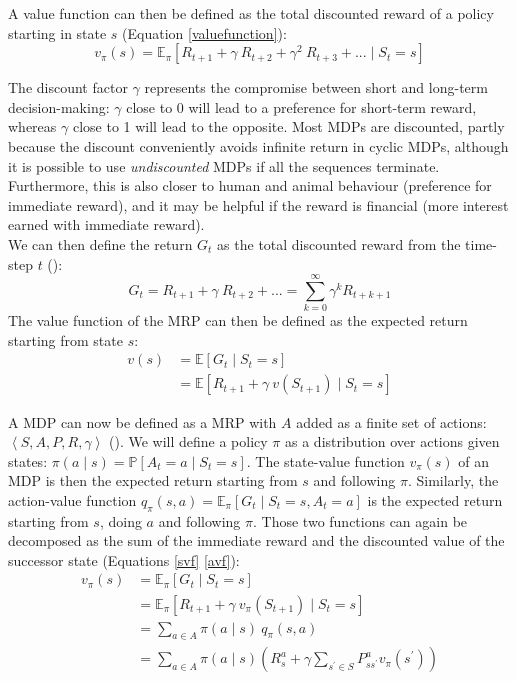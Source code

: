  A value function can then be defined as the total discounted reward of a policy starting in state $s$ (Equation \ref{valuefunction}):
\begin{equation}
\label{valuefunction}
	v_{\pi}(s)=\mathbb{E}_{\pi} \left[R_{t+1}+\gamma \: R_{t+2} + \gamma^{2} \:R_{t+3} + ... \mid S_t = s \right]
\end{equation}

 The discount factor $\gamma$ represents the compromise between short and long-term decision-making: $\gamma$ close to 0 will lead to a preference for short-term reward, whereas $\gamma$ close to 1 will lead to the opposite. Most MDPs are discounted, partly because the discount conveniently avoids infinite return in cyclic MDPs, although it is possible to use \textit{undiscounted} MDPs if all the sequences terminate. Furthermore, this is also closer to human and animal behaviour (preference for immediate reward), and it may be helpful if the reward is financial (more interest earned with immediate reward).\\
 We can then define the return $G_t$ as the total discounted reward from the time-step $t$ (\cite{silver2015}): 
 \begin{equation}
 	G_t = R_{t+1} + \gamma \: R_{t+2} + ... = \sum\limits_{k=0}^{\infty}\gamma^{k}R_{t+k+1}
 \end{equation}
 The value function of the MRP can then be defined as the expected return starting from state $s$:
 \begin{equation}
 \begin{split}
 	v(s) & = \mathbb{E}\left[G_t \mid S_t = s\right] \\
 	 & = \mathbb{E}\left[ R_{t+1} + \gamma \: v(S_{t+1}) \mid S_t= s \right]
 \end{split}
 \end{equation}
 
A MDP can now be defined as a MRP with $A$ added as a finite set of actions: $\left< S,A,P,R,\gamma \right>$ (\cite{mdpinai}). We will define a policy $\pi$ as a distribution over actions given states: $\pi(a \mid s) = \mathbb{P} [A_t = a \mid S_t = s]$. The state-value function $v_{\pi}(s)$ of an MDP is then the expected return starting from $s$ and following $\pi$. Similarly, the action-value function $q_{\pi}(s,a)= \mathbb{E}_{\pi}[G_t \mid S_t = s, A_t = a]$ is the expected return starting from $s$, doing $a$ and following $\pi$. Those two functions can again be decomposed as the sum of the immediate reward and the discounted value of the successor state (Equations \ref{svf} \ref{avf}):
 \begin{equation}
 \label{svf}
 	\begin{split}
 		v_\pi(s) & = \mathbb{E}_{\pi}[G_t \mid S_t = s] \\
 		& = \mathbb{E}_{\pi}[R_{t+1} + \gamma \: v_{\pi}(S_{t+1}) \mid S_t = s] \\
 		& = \sum\limits_{a \in A}\pi(a\mid
 		s) \: q_\pi(s,a) \\
 		& = \sum\limits_{a \in A}\pi(a \mid s)\left( R_s^{a} +\gamma \sum\limits_{s^{'} \in S} P_{ss^{'}}^{a}v_\pi(s^{'})\right)
 	\end{split}
 \end{equation}
 

